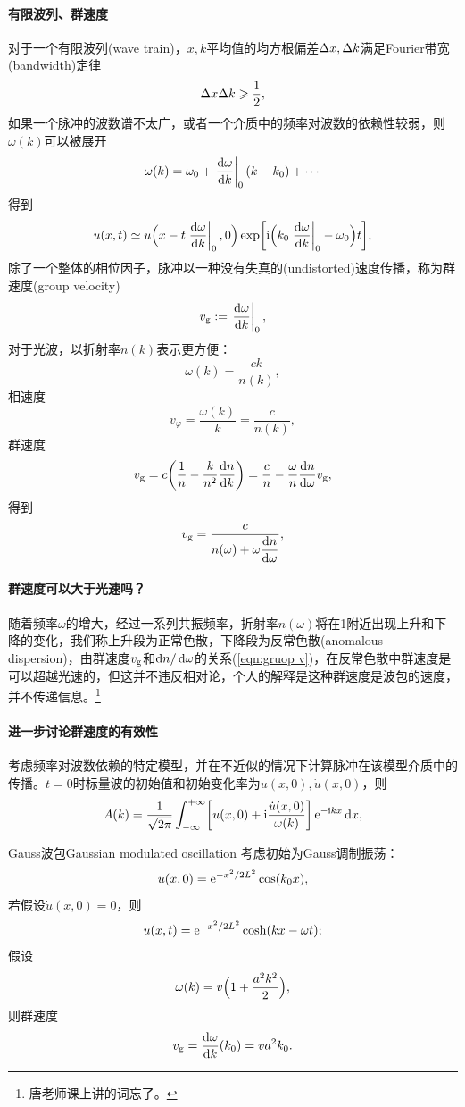 \paragraph{有限波列、群速度}
对于一个有限波列(wave train)，$x,k$平均值的均方根偏差$\Delta x,\Delta k$满足Fourier带宽(bandwidth)定律
\begin{equation}
    \Delta x\Delta k\geqslant\frac12,
\end{equation}
如果一个脉冲的波数谱不太广，或者一个介质中的频率对波数的依赖性较弱，则$\omega(k)$可以被展开
\[
    \omega(k)=\omega_0+\left.\frac{\mathrm{d}^{\;\!\!}\omega}{\mathrm{d} k^{\;\!\!}}\right\rvert_0(k-k_0)+\cdots
\]
得到 
\[
    u(x,t)\simeq u\Bigkh{x-t\edg{\dv\omega k}_0,0}\exp\biggfkh{\i\Bigkh{k_0\edg{\dv\omega k}_0-\omega_0}t},
\]
除了一个整体的相位因子，脉冲以一种没有失真的(undistorted)速度传播，称为群速度(group velocity)
\begin{equation}
    v_\text g:=\left.\frac{\mathrm{d}^{\;\!\!}\omega}{\mathrm{d} k^{\;\!\!}}\right\rvert_0,
\end{equation}
对于光波，以折射率$n(k)$表示更方便：
\[
    \omega(k)=\frac{ck}{n(k)},
\]
相速度
\[
    v_\varphi=\frac{\omega(k)}k=\frac c{n(k)},
\]
群速度
\[
    v_\text g=c\biggkh{\frac1n-\frac k{n^2}\dv nk}=\frac cn-\frac\omega n\dv n\omega v_\text g,
\]
得到 
\begin{equation}
    \label{eqn:gruop v}
    v_\text g=\frac c{\displaystyle n(\omega)+\omega\frac{\mathrm{d}^{\;\!\!}n}{\mathrm{d} \omega^{\;\!\!}}},
\end{equation}
\paragraph{群速度可以大于光速吗？}
随着频率$\omega$的增大，经过一系列共振频率，折射率$n(\omega)$将在1附近出现上升和下降的变化，我们称上升段为正常色散，下降段为反常色散(anomalous dispersion)，由群速度$v_\text g$和$\mathop{}\!\mathrm{d} n/\mathop{}\!\mathrm{d}\omega$的关系(\ref{eqn:gruop v})，在反常色散中群速度是可以超越光速的，但这并不违反相对论，个人的解释是这种群速度是波包的速度，并不传递信息。\footnote{唐老师课上讲的词忘了。}
\paragraph{进一步讨论群速度的有效性}
考虑频率对波数依赖的特定模型，并在不近似的情况下计算脉冲在该模型介质中的传播。$t=0$时标量波的初始值和初始变化率为$u(x,0),\dot u(x,0)$，则 
\[
    A(k)=\frac1{\sqrt{2\pi}}\int_{-\infty}^{+\infty}\biggl[u(x,0)+\mathrm{i}\frac{\dot u(x,0)}{\omega(k)}\biggr]\mathop{}\!\mathrm{e}^{-\mathrm{i} kx}\mathop{}\!\mathrm{d} x,
\]
\begin{example}{Gauss波包}{Gaussian modulated oscillation}
    考虑初始为Gauss调制振荡：
    \[
        u(x,0)=\mathop{}\!\mathrm{e}^{-x^2/2L^2}\cos(k_0x),
    \]
    若假设$\dot u(x,0)=0$，则
    \[
        u(x,t)=\mathop{}\!\mathrm{e}^{-x^2/2L^2}\cosh(kx-\omega t);
    \]
    \tcblower
    假设 
    \[
        \omega(k)=v\Bigl(1+\frac{a^2k^2}2\Bigr),
    \]
    则群速度
    \[
        v_\text g=\frac{\mathrm{d}^{\;\!\!}\omega}{\mathrm{d} k^{\;\!\!}}(k_0)=va^2k_0.
    \]
\end{example}
